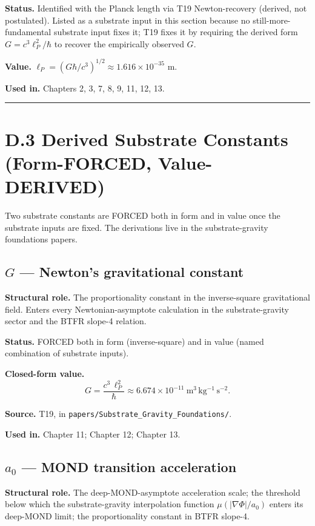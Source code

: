 \documentclass[11pt]{book}
\begin{document}
\textbf{Status.} Identified with the Planck length via T19 Newton-recovery (derived, not postulated). Listed as a substrate input in this section because no still-more-fundamental substrate input fixes it; T19 fixes it by requiring the derived form $G = c^3\ell_P^2/\hbar$ to recover the empirically observed $G$.

\textbf{Value.} $\ell_P = (G\hbar/c^3)^{1/2} \approx 1.616 \times 10^{-35}$ m.

\textbf{Used in.} Chapters 2, 3, 7, 8, 9, 11, 12, 13.

\bigskip\hrule\bigskip

\section{D.3 Derived Substrate Constants (Form-FORCED, Value-DERIVED)}

Two substrate constants are FORCED both in form and in value once the substrate inputs are fixed. The derivations live in the substrate-gravity foundations papers.

\subsection{$G$ — Newton's gravitational constant}

\textbf{Structural role.} The proportionality constant in the inverse-square gravitational field. Enters every Newtonian-asymptote calculation in the substrate-gravity sector and the BTFR slope-4 relation.

\textbf{Status.} FORCED both in form (inverse-square) and in value (named combination of substrate inputs).

\textbf{Closed-form value.}
\[
G = \frac{c^3\,\ell_P^2}{\hbar} \approx 6.674 \times 10^{-11}\ \mathrm{m^3\,kg^{-1}\,s^{-2}}.
\]

\textbf{Source.} T19, in \texttt{papers/Substrate\_Gravity\_Foundations/}.

\textbf{Used in.} Chapter 11; Chapter 12; Chapter 13.

\subsection{$a_0$ — MOND transition acceleration}

\textbf{Structural role.} The deep-MOND-asymptote acceleration scale; the threshold below which the substrate-gravity interpolation function $\mu(|\nabla\Phi|/a_0)$ enters its deep-MOND limit; the proportionality constant in BTFR slope-4.
\end{document}
